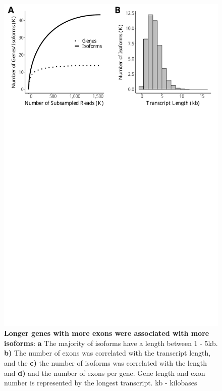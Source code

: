 \begin{figure}[htp]
	\begin{center}
		\includegraphics[page=5,trim={0 12cm 0 0},clip,scale = 0.55]{Figures/IsoSeqWholeTranscriptome.pdf}
	\end{center}
	\captionsetup{width=0.95\textwidth}
	\caption[Correlation of isoform diversity with transcript length and number of exons]%
	{\textbf{Longer genes with more exons were associated with more isoforms}: \textbf{a} The majority of isoforms have a length between 1 - 5kb. \textbf{b)} The number of exons was correlated with the transcript length, and the \textbf{c)} the number of isoforms was correlated with the length and \textbf{d)} and the number of exons per gene. Gene length and exon number is represented by the longest transcript. kb - kilobases}
	\label{fig:isoseq_whole_isoform_length_corr}
\end{figure}


